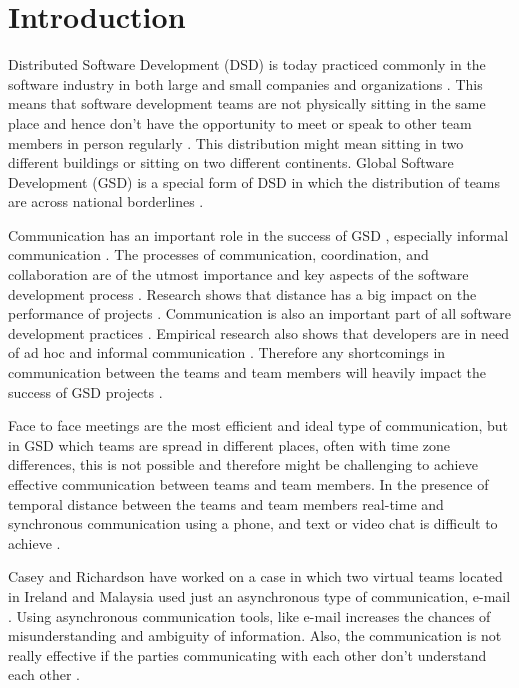 \chapter{Introduction}
Distributed Software Development (DSD) is today practiced commonly in the software industry in both large and small companies and organizations \citep{shrivastava2010distributed}. This means that software development teams are not physically sitting in the same place and hence don’t have the opportunity to meet or speak to other team members in person regularly \citep{layman2006essential}. This distribution might mean sitting in two different buildings or sitting on two different continents. Global Software Development (GSD) is a special form of DSD in which the distribution of teams are across national borderlines \citep{sahay2003global}. 

Communication has an important role in the success of GSD \citep{carmel2001tactical}\citep{french1998study}, especially informal communication \citep{herbsleb2003empirical}. The processes of communication, coordination, and collaboration are of the utmost importance and key aspects of the software development process \citep{colomo2014agile}. Research shows that distance has a big impact on the performance of projects \citep{damian2003global}\citep{herbsleb2001global}. Communication is also an important part of all software development practices \citep{layman2006essential}. Empirical research also shows that developers are in need of ad hoc and informal communication \citep{grinter1998recomposition}\citep{kraut1995coordination}. Therefore any shortcomings in communication between the teams and team members will heavily impact the success of GSD projects \citep{layman2006essential}.

Face to face meetings are the most efficient and ideal type of communication, but in GSD which teams are spread in different places, often with time zone differences, this is not possible and therefore might be challenging to achieve effective communication between teams and team members. In the presence of temporal distance between the teams and team members real-time and synchronous communication using a phone, and text or video chat is difficult to achieve \citep{holmstrom2006agile}\citep{kommeren2007philips}.

Casey and Richardson have worked on a case in which two virtual teams located in Ireland and Malaysia used just an asynchronous type of communication, e-mail \citep{casey2008impact}. Using asynchronous communication tools, like e-mail increases the chances of misunderstanding and ambiguity of information. Also, the communication is not really effective if the parties communicating with each other don’t understand each other \citep{kommeren2007philips}\citep{cataldo2007coordination}.

